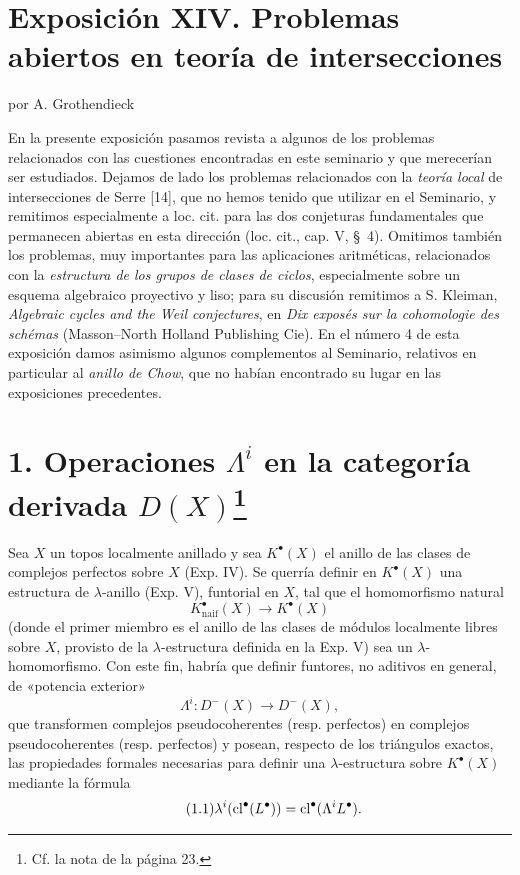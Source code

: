 
\providecommand{\sisi}[2]{#2}

\section*{Exposición XIV. Problemas abiertos en teoría de intersecciones}
\begin{center}
por A. Grothendieck
\end{center}

En la presente exposición pasamos revista a algunos de los problemas
relacionados con las cuestiones encontradas en este seminario y que
merecerían ser estudiados. Dejamos de lado los problemas relacionados con la
\emph{teoría local} de intersecciones de Serre [14], que no hemos tenido que
utilizar en el Seminario, y remitimos especialmente a loc. cit. para las dos
conjeturas fundamentales que permanecen abiertas en esta dirección
(loc. cit., cap. V, \S~4). Omitimos también los problemas, muy importantes
para las aplicaciones aritméticas, relacionados con la \emph{estructura de
los grupos de clases de ciclos}, especialmente sobre un esquema algebraico
proyectivo y liso; para su discusión remitimos a S. Kleiman,
\emph{Algebraic cycles and the Weil conjectures}, en \emph{Dix exposés sur
la cohomologie des schémas} (Masson--North Holland Publishing Cie). En el
número 4 de esta exposición damos asimismo algunos complementos al
Seminario, relativos en particular al \emph{anillo de Chow}, que no habían
encontrado su lugar en las exposiciones precedentes.

\section*{1. Operaciones $\Lambda^i$ en la categoría derivada
$D(X)$\footnote{Cf. la nota de la página 23.}}

Sea $X$ un topos localmente anillado y sea $K^\bullet(X)$ el anillo de las
clases de complejos perfectos sobre $X$ (Exp. IV). Se querría definir en
$K^\bullet(X)$ una estructura de $\lambda$-anillo (Exp. V), funtorial en
$X$, tal que el homomorfismo natural
\[
K^\bullet_{\mathrm{naif}}(X)\longrightarrow K^\bullet(X)
\]
(donde el primer miembro es el anillo de las clases de módulos localmente
libres sobre $X$, provisto de la $\lambda$-estructura definida en la Exp. V)
sea un $\lambda$-homomorfismo. Con este fin, habría que definir funtores, no
aditivos en general, de «potencia exterior»
\[
\Lambda^i:D^-(X)\longrightarrow D^-(X),
\]
que transformen complejos pseudocoherentes (resp. perfectos) en complejos
pseudocoherentes (resp. perfectos) y posean, respecto de los triángulos
exactos, las propiedades formales necesarias para definir una
$\lambda$-estructura sobre $K^\bullet(X)$ mediante la fórmula
\begin{equation}\tag{1.1}
\lambda^i(\operatorname{cl}^\bullet(L^\bullet))=\operatorname{cl}^\bullet(\Lambda^i L^\bullet).
\end{equation}

